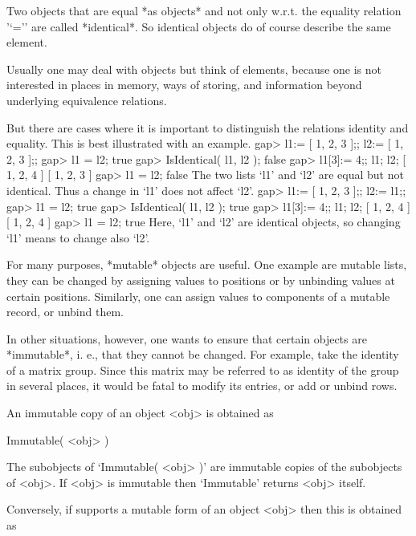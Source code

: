 
Two objects that are equal *as objects* and not only w.r.t. the equality
relation '`='' are called *identical*.
So identical objects do of course describe the same element.

Usually one may deal with objects but think of elements,
because one is not interested in places in memory, ways of storing,
and information beyond underlying equivalence relations.

But there are cases where it is important to distinguish the relations
identity and equality.
This is best illustrated with an example.
\beginexample
    gap> l1:= [ 1, 2, 3 ];; l2:= [ 1, 2, 3 ];;
    gap> l1 = l2;
    true
    gap> IsIdentical( l1, l2 );
    false
    gap> l1[3]:= 4;; l1; l2;
    [ 1, 2, 4 ]
    [ 1, 2, 3 ]
    gap> l1 = l2;
    false
\endexample
The two lists `l1' and `l2' are equal but not identical.
Thus a change in `l1' does not affect `l2'.
\beginexample
    gap> l1:= [ 1, 2, 3 ];; l2:= l1;;
    gap> l1 = l2;
    true
    gap> IsIdentical( l1, l2 );
    true
    gap> l1[3]:= 4;; l1; l2;
    [ 1, 2, 4 ]
    [ 1, 2, 4 ]
    gap> l1 = l2;
    true
\endexample
Here, `l1' and `l2' are identical objects,
so changing `l1' means to change also `l2'.


For many purposes, *mutable* objects are useful.
One example are mutable lists,
they can be changed by assigning values to positions
or by unbinding values at certain positions.
Similarly, one can assign values to components of a mutable record,
or unbind them.

In other situations, however,
one wants to ensure that certain objects are *immutable*,
i. e., that they cannot be changed.
For example, take the identity of a matrix group.
Since this matrix may be referred to as identity of the group in several
places, it would be fatal to modify its entries, or add or unbind rows.

An immutable copy of an object <obj> is obtained as

\>Immutable( <obj> )

The subobjects of `Immutable( <obj> )' are immutable copies of the
subobjects of <obj>.
If <obj> is immutable then `Immutable' returns <obj> itself.

Conversely, if {\GAP} supports a mutable form of an object <obj>
then this is obtained as

